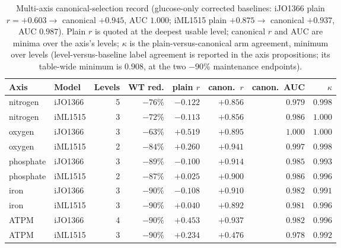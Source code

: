 \documentclass[11pt,a4paper]{article}
\theoremstyle{plain}
\theoremstyle{definition}
\theoremstyle{remark}
\begin{document}
\begin{table}[t]
\centering
\small
\caption{Multi-axis canonical-selection record (glucose-only
corrected baselines: iJO1366 plain $r=+0.603\to$ canonical
$+0.945$, AUC $1.000$; iML1515 plain $+0.875\to$ canonical
$+0.937$, AUC $0.987$). Plain $r$ is quoted at the deepest usable
level; canonical $r$ and AUC are minima over the axis's levels;
$\kappa$ is the plain-versus-canonical arm agreement, minimum over
levels (level-versus-baseline label agreement is reported in the
axis propositions; its table-wide minimum is $0.908$, at the two
$-90\%$ maintenance endpoints).}
\label{tab:canonical-multiaxis}
\begin{tabular}{llrrrrrr}
\toprule
Axis & Model & Levels & WT red. & plain $r$ & canon.\ $r$ &
canon.\ AUC & $\kappa$ \\
\midrule
nitrogen & iJO1366 & 5 & $-76\%$ & $-0.122$ & $+0.856$ & $0.979$ & $0.998$ \\
nitrogen & iML1515 & 3 & $-72\%$ & $-0.113$ & $+0.856$ & $0.986$ & $1.000$ \\
oxygen & iJO1366 & 3 & $-63\%$ & $+0.519$ & $+0.895$ & $1.000$ & $1.000$ \\
oxygen & iML1515 & 2 & $-84\%$ & $+0.260$ & $+0.941$ & $0.997$ & $0.998$ \\
phosphate & iJO1366 & 3 & $-89\%$ & $-0.100$ & $+0.914$ & $0.985$ & $0.993$ \\
phosphate & iML1515 & 2 & $-87\%$ & $+0.025$ & $+0.900$ & $0.986$ & $0.996$ \\
iron & iJO1366 & 3 & $-90\%$ & $-0.108$ & $+0.910$ & $0.982$ & $0.991$ \\
iron & iML1515 & 3 & $-90\%$ & $+0.040$ & $+0.892$ & $0.981$ & $0.996$ \\
ATPM & iJO1366 & 4 & $-90\%$ & $+0.453$ & $+0.937$ & $0.982$ & $0.996$ \\
ATPM & iML1515 & 3 & $-90\%$ & $+0.234$ & $+0.476$ & $0.978$ & $0.992$ \\
\bottomrule
\end{tabular}
\end{table}
\end{document}
